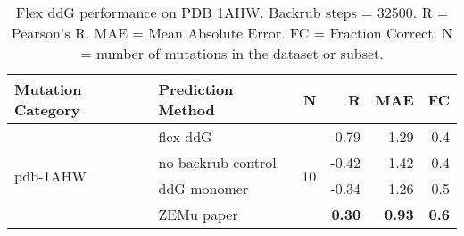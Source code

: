 \begin{table}
  \begin{tabular}{llrrrr}
\toprule
Mutation Category &   Prediction Method &   N &     R &  MAE &  FC \\
\midrule
 \multirow{ 4}{*}{pdb-1AHW} & flex ddG & \multirow{ 4}{*}{10} & -0.79 & 1.29 & 0.4  \\
 & no backrub control & & -0.42 & 1.42 & 0.4  \\
 & ddG monomer & & -0.34 & 1.26 & 0.5  \\
 & ZEMu paper & & \textbf{0.30} & \textbf{0.93} & \textbf{0.6}  \\
\bottomrule
\end{tabular}
  \caption[Flex ddG performance on PDB 1AHW]{
    Flex ddG performance on PDB 1AHW. Backrub steps = 32500. R = Pearson's R. MAE = Mean Absolute Error. FC = Fraction Correct. N = number of mutations in the dataset or subset.
  } \label{tab:table-pdb-1AHW}
\end{table}

